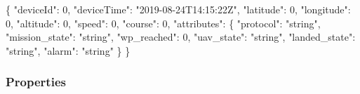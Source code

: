 \documentclass[
]{article}
\newenvironment{Shaded}{}{}
\newcommand{\DataTypeTok}[1]{\textcolor[rgb]{0.56,0.13,0.00}{#1}}
\newcommand{\DecValTok}[1]{\textcolor[rgb]{0.25,0.63,0.44}{#1}}
\newcommand{\FunctionTok}[1]{\textcolor[rgb]{0.02,0.16,0.49}{#1}}
\newcommand{\StringTok}[1]{\textcolor[rgb]{0.25,0.44,0.63}{#1}}
\begin{document}
\begin{Shaded}
\begin{Highlighting}[]
\FunctionTok{\{}
  \DataTypeTok{"deviceId"}\FunctionTok{:} \DecValTok{0}\FunctionTok{,}
  \DataTypeTok{"deviceTime"}\FunctionTok{:} \StringTok{"2019{-}08{-}24T14:15:22Z"}\FunctionTok{,}
  \DataTypeTok{"latitude"}\FunctionTok{:} \DecValTok{0}\FunctionTok{,}
  \DataTypeTok{"longitude"}\FunctionTok{:} \DecValTok{0}\FunctionTok{,}
  \DataTypeTok{"altitude"}\FunctionTok{:} \DecValTok{0}\FunctionTok{,}
  \DataTypeTok{"speed"}\FunctionTok{:} \DecValTok{0}\FunctionTok{,}
  \DataTypeTok{"course"}\FunctionTok{:} \DecValTok{0}\FunctionTok{,}
  \DataTypeTok{"attributes"}\FunctionTok{:} \FunctionTok{\{}
    \DataTypeTok{"protocol"}\FunctionTok{:} \StringTok{"string"}\FunctionTok{,}
    \DataTypeTok{"mission\_state"}\FunctionTok{:} \StringTok{"string"}\FunctionTok{,}
    \DataTypeTok{"wp\_reached"}\FunctionTok{:} \DecValTok{0}\FunctionTok{,}
    \DataTypeTok{"uav\_state"}\FunctionTok{:} \StringTok{"string"}\FunctionTok{,}
    \DataTypeTok{"landed\_state"}\FunctionTok{:} \StringTok{"string"}\FunctionTok{,}
    \DataTypeTok{"alarm"}\FunctionTok{:} \StringTok{"string"}
  \FunctionTok{\}}
\FunctionTok{\}}
\end{Highlighting}
\end{Shaded}

\hypertarget{properties-2}{%
\subsubsection{Properties}\label{properties-2}}
\end{document}

